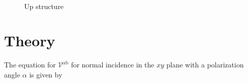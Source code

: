 \documentclass[prb,11pt,tightenlines,twocolumn,aps]{revtex4-1}
\begin{document}
\begin{figure}[ht!]
    \centering
    \label{fig:up-struc-xz}
    \\
    \label{fig:up-struc-xy}
    \caption{Up structure}
    \label{fig:up-struc}
\end{figure}
\blindtext
\blindtext

\blindtext


\section{Theory} %
\label{sec:theory}
The equation for $\mathcal{V}^{\mathrm{ab}}$ for normal incidence in the $xy$
plane with a polarization angle $\alpha$ is given by
\end{document}
